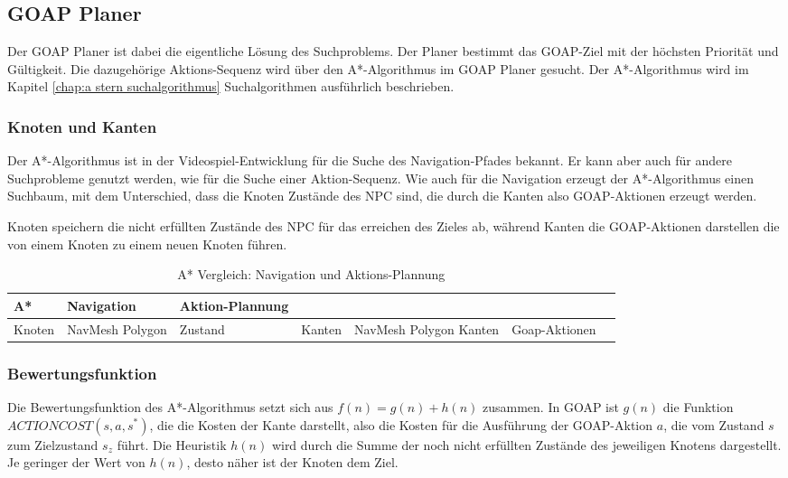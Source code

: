\subsection{GOAP Planer}
\label{chap:goap planer}

Der GOAP Planer ist dabei die eigentliche L\"{o}sung des Suchproblems. Der Planer bestimmt das GOAP-Ziel mit der h\"{o}chsten Priorit\"{a}t und G\"{u}ltigkeit. Die dazugeh\"{o}rige Aktions-Sequenz wird \"{u}ber den A*-Algorithmus im GOAP Planer gesucht. Der A*-Algorithmus wird im Kapitel \ref{chap:a stern suchalgorithmus} Suchalgorithmen ausf\"{u}hrlich beschrieben.

\subsubsection{Knoten und Kanten}
\label{chap:goap knoten und kanten}

Der A*-Algorithmus ist in der Videospiel-Entwicklung f\"{u}r die Suche des Navigation-Pfades bekannt. Er kann aber auch f\"{u}r andere Suchprobleme genutzt werden, wie f\"{u}r die Suche einer Aktion-Sequenz. Wie auch f\"{u}r die Navigation erzeugt der A*-Algorithmus einen Suchbaum, mit dem Unterschied, dass die Knoten Zust\"{a}nde des NPC sind, die durch die Kanten also GOAP-Aktionen erzeugt werden.

Knoten speichern die nicht erf\"{u}llten Zust\"{a}nde des NPC f\"{u}r das erreichen des Zieles ab, w\"{a}hrend Kanten die GOAP-Aktionen darstellen die von einem Knoten zu einem neuen Knoten f\"{u}hren.

\begin{table}[h]
  \caption{A* Vergleich: Navigation und Aktions-Plannung}
  \label{A*: Vergleich}
  \renewcommand{\arraystretch}{1.2}
  \centering
  \small
    \begin{tabularx}{0.95\textwidth}{X X X}
      \toprule
      \textbf{A*} & \textbf{Navigation} & \textbf{Aktion-Plannung}\\
      \midrule
      Knoten & NavMesh Polygon & Zustand &
			Kanten & NavMesh Polygon Kanten & Goap-Aktionen &
      \bottomrule
    \end{tabularx}
\end{table}


\subsubsection{Bewertungsfunktion}
\label{chap:goap bewertungsfunktion}

Die Bewertungsfunktion des A*-Algorithmus setzt sich aus $f(n) = g(n) + h(n)$ zusammen. In GOAP ist $g(n)$ die Funktion $\textit{ACTIONCOST}(s,a,s^*)$, die die Kosten der Kante darstellt, also die Kosten f\"{u}r die Ausf\"{u}hrung der GOAP-Aktion $a$, die vom Zustand $s$ zum Zielzustand $s_z$ f\"{u}hrt. Die Heuristik $h(n)$ wird durch die Summe der noch nicht erf\"{u}llten Zust\"{a}nde des jeweiligen Knotens dargestellt. Je geringer der Wert von $h(n)$, desto n\"{a}her ist der Knoten dem Ziel. 


